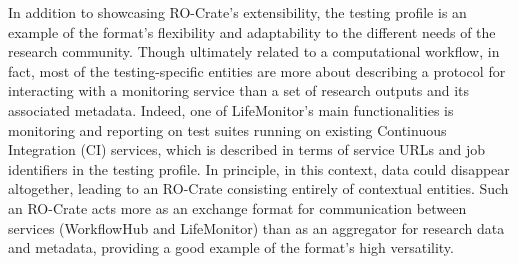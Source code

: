 {}In addition to showcasing RO-Crate's extensibility, the testing profile is an example of the format's flexibility and adaptability to the different needs of the research community. Though ultimately related to a computational workflow, in fact, most of the testing-specific entities are more about describing a protocol for interacting with a monitoring service than a set of research outputs and its associated metadata. Indeed, one of LifeMonitor's main functionalities is monitoring and reporting on test suites running on existing Continuous Integration (CI) services, which is described in terms of service URLs and job identifiers in the testing profile. In principle, in this context, data could disappear altogether, leading to an RO-Crate consisting entirely of contextual entities. Such an RO-Crate acts more as an exchange format for communication between services (WorkflowHub and LifeMonitor) than as an aggregator for research data and metadata, providing a good example of the format's high versatility.\relax